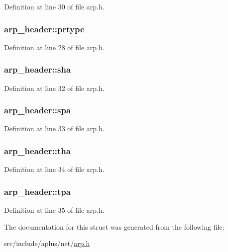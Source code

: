 Definition at line 30 of file arp.\+h.

\hypertarget{structarp__header_aa1b4067ef393ffcada7937d04546570e}{
\subsubsection[{prtype}]{ arp\+\_\+header\+::prtype}}\label{structarp__header_aa1b4067ef393ffcada7937d04546570e}


Definition at line 28 of file arp.\+h.

\hypertarget{structarp__header_a1e1ad1e3d78b390d8f31b83cc2d48adc}{
\subsubsection[{sha}]{ arp\+\_\+header\+::sha}}\label{structarp__header_a1e1ad1e3d78b390d8f31b83cc2d48adc}


Definition at line 32 of file arp.\+h.

\hypertarget{structarp__header_a339356e9ca215db53a3491288ffac730}{
\subsubsection[{spa}]{ arp\+\_\+header\+::spa}}\label{structarp__header_a339356e9ca215db53a3491288ffac730}


Definition at line 33 of file arp.\+h.

\hypertarget{structarp__header_a013af95c55ed102d198feeab64ce45ee}{
\subsubsection[{tha}]{ arp\+\_\+header\+::tha}}\label{structarp__header_a013af95c55ed102d198feeab64ce45ee}


Definition at line 34 of file arp.\+h.

\hypertarget{structarp__header_aedc5d2cdff377ab3192ed264d060e914}{
\subsubsection[{tpa}]{ arp\+\_\+header\+::tpa}}\label{structarp__header_aedc5d2cdff377ab3192ed264d060e914}


Definition at line 35 of file arp.\+h.



The documentation for this struct was generated from the following file\+:\begin{DoxyCompactItemize}
\item 
src/include/aplus/net/\hyperlink{arp_8h}{arp.\+h}\end{DoxyCompactItemize}
